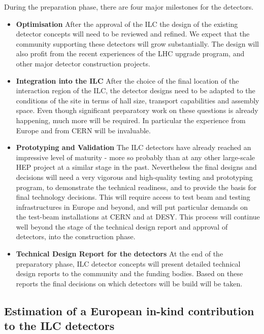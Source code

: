 \documentclass[%
 reprint,
 floatfix,
 amsmath,amssymb,
 aps,
]{revtex4-1}
\begin{document}
During the preparation phase, there are four major milestones for the
detectors.
\begin{itemize}

\item{\bfseries Optimisation} After the approval of the ILC the design of the 
existing detector concepts will need to be reviewed and refined. We expect that 
the community supporting these detectors will grow substantially. The design 
will also profit from the recent experiences of the LHC upgrade program, and 
other major detector construction projects. 

\item{\bfseries Integration into the ILC}
After the choice of the final location of the interaction region of the ILC, the 
detector designs need to be adapted to the
conditions of the site in terms of hall size, transport capabilities and
assembly space. Even though significant preparatory work on these questions is 
already happening, much more will be required. In particular the experience from 
Europe and from CERN will be invaluable. 

 
\item{\bfseries Prototyping and Validation}
The ILC detectors have already reached an impressive level of maturity - more so 
probably than at any other large-scale HEP project at a similar stage in the 
past. Nevertheless the final designs and decisions will need a very vigorous and 
high-quality testing and prototyping program, to demonstrate the technical 
readiness, and to provide the basis for final technology decisions. This will 
require access to test beam and testing infrastructures in Europe and beyond, 
and will put particular demands on the test-beam installations at CERN and at 
DESY. This process will continue well beyond the stage of the technical design 
report and approval of detectors, into the construction phase.

\item{\bfseries Technical Design Report for the detectors}
At the end of the preparatory phase, ILC detector concepts will present 
detailed technical design reports to the community and the funding bodies. Based 
on these reports the final decisions on which detectors will be build will be 
taken. 
\end{itemize}



\subsection{\label{sec:det:constructionmodel} Estimation of a
European in-kind contribution to the ILC detectors}
\end{document}

